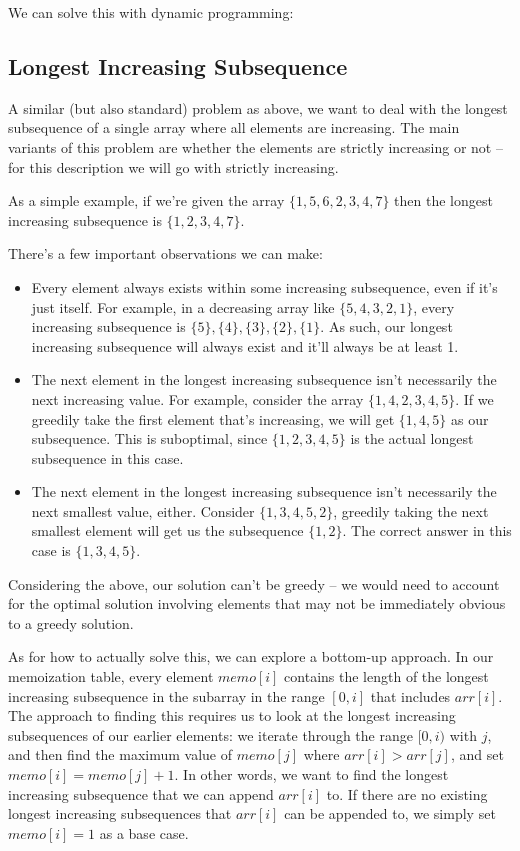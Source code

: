 We can solve this with dynamic programming:


\subsection{Longest Increasing Subsequence}

A similar (but also standard) problem as above, we want to deal with the longest subsequence of a single array where all elements are increasing. The main variants of this problem are whether the elements are strictly increasing or not -- for this description we will go with strictly increasing.

As a simple example, if we're given the array $\{1,5,6,2,3,4,7\}$ then the longest increasing subsequence is $\{1,2,3,4,7\}$.

There's a few important observations we can make:
\begin{itemize}
\item Every element always exists within some increasing subsequence, even if it's just itself. For example, in a decreasing array like $\{5,4,3,2,1\}$, every increasing subsequence is $\{5\},\{4\},\{3\},\{2\},\{1\}$. As such, our longest increasing subsequence will always exist and it'll always be at least 1.
\item The next element in the longest increasing subsequence isn't necessarily the next increasing value. For example, consider the array $\{1,4,2,3,4,5\}$. If we greedily take the first element that's increasing, we will get $\{1,4,5\}$ as our subsequence. This is suboptimal, since $\{1,2,3,4,5\}$ is the actual longest subsequence in this case.
\item The next element in the longest increasing subsequence isn't necessarily the next smallest value, either. Consider $\{1,3,4,5,2\}$, greedily taking the next smallest element will get us the subsequence $\{1,2\}$. The correct answer in this case is $\{1,3,4,5\}$.
\end{itemize}

Considering the above, our solution can't be greedy -- we would need to account for the optimal solution involving elements that may not be immediately obvious to a greedy solution.

As for how to actually solve this, we can explore a bottom-up approach. In our memoization table, every element $memo[i]$ contains the length of the longest increasing subsequence in the subarray in the range $[0,i]$ that includes $arr[i]$. The approach to finding this requires us to look at the longest increasing subsequences of our earlier elements: we iterate through the range $[0,i)$ with $j$, and then find the maximum value of $memo[j]$ where $arr[i] > arr[j]$, and set $memo[i] = memo[j] + 1$. In other words, we want to find the longest increasing subsequence that we can append $arr[i]$ to. If there are no existing longest increasing subsequences that $arr[i]$ can be appended to, we simply set $memo[i] = 1$ as a base case.

